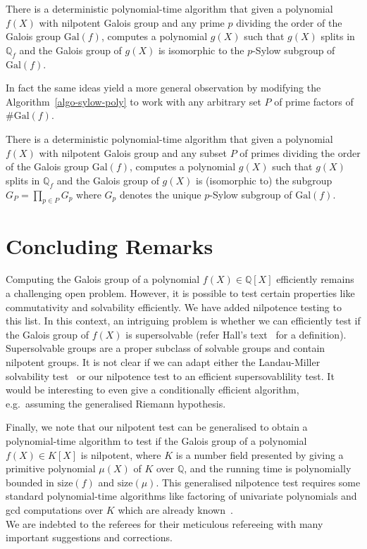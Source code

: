 \documentclass[prodmod,acmtalg]{acmsmall}
\newcommand{\size}[1]{{\ensuremath{\mathrm{size}\left(#1\right)}}}
\newcommand{\Gal}[1]{{\ensuremath{\mathrm{Gal}\left(#1\right)}}}
\newcommand{\Q}{\ensuremath{\mathbb{Q}}}
\begin{document}
\begin{theorem}\label{thm-sylow-poly}
  There is a deterministic polynomial-time algorithm that given a
  polynomial $f(X)$ with nilpotent Galois group and any prime $p$
  dividing the order of the Galois group $\Gal{f}$, computes a
  polynomial $g(X)$ such that $g(X)$ splits in $\Q_f$ and the Galois
  group of $g(X)$ is isomorphic to the $p$-Sylow subgroup of
  $\Gal{f}$.
\end{theorem}

In fact the same ideas yield a more general observation by
modifying the Algorithm~\ref{algo-sylow-poly} to work with
any arbitrary set $P$ of prime factors of $\# \Gal{f}$.

\begin{theorem}
  There is a deterministic polynomial-time algorithm that given a
  polynomial $f(X)$ with nilpotent Galois group and any subset $P$ of
  primes dividing the order of the Galois group $\Gal{f}$, computes a
  polynomial $g(X)$ such that $g(X)$ splits in $\Q_f$ and the Galois
  group of $g(X)$ is (isomorphic to) the subgroup $G_P = \prod_{p \in
    P} G_p$ where $G_p$ denotes the unique $p$-Sylow subgroup of
  $\Gal{f}$.
\end{theorem}

\section{Concluding Remarks}

Computing the Galois group of a polynomial $f(X)\in\Q[X]$ efficiently
remains a challenging open problem. However, it is possible to test
certain properties like commutativity and solvability efficiently. We
have added nilpotence testing to this list. In this context, an
intriguing problem is whether we can efficiently test if the Galois
group of $f(X)$ is supersolvable (refer Hall's text~\cite[Chapter
10]{Hall} for a definition).  Supersolvable groups are a proper
subclass of solvable groups and contain nilpotent groups.  It is not
clear if we can adapt either the Landau-Miller solvability
test~\cite{landau85solvability} or our nilpotence test to an efficient
supersovablility test. It would be interesting to even give a
conditionally efficient algorithm, e.g.\ assuming the generalised
Riemann hypothesis.

Finally, we note that our nilpotent test can be generalised to obtain
a polynomial-time algorithm to test if the Galois group of a
polynomial $f(X) \in K[X]$ is nilpotent, where $K$ is a number field
presented by giving a primitive polynomial $\mu(X)$ of $K$ over $\Q$,
and the running time is polynomially bounded in $\size{f}$ and
$\size{\mu}$. This generalised nilpotence test requires some standard
polynomial-time algorithms like factoring of univariate polynomials
and gcd computations over $K$ which are already
known~\cite{landau85factoring}.\\

We are indebted to the referees for their meticulous refereeing with
many important suggestions and corrections.



\end{document}
